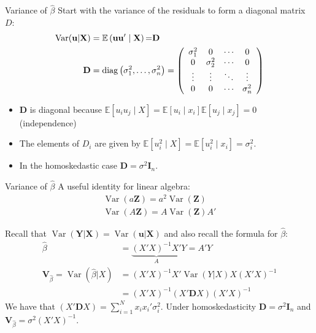 \documentclass[aspectratio=169,11pt]{beamer}
\begin{document}
\begin{frame}{Variance of $\widehat{\beta}$}
Start with the variance of the residuals to form a \alert{diagonal} matrix $D$:
\begin{align*}
\operatorname { Var } ( \mathbf{u} | \mathbf { X } ) &= \mathbb { E } \left( \mathbf{u u} ^ { \prime } \mid \mathbf { X } \right){ = } \mathbf { D }\\
\mathbf { D } &= \operatorname { diag } \left( \sigma _ { 1 } ^ { 2 } , \ldots , \sigma _ { n } ^ { 2 } \right) = \left( \begin{array} { c c c c } { \sigma _ { 1 } ^ { 2 } } & { 0 } & { \cdots } & { 0 } \\ { 0 } & { \sigma _ { 2 } ^ { 2 } } & { \cdots } & { 0 } \\ { \vdots } & { \vdots } & { \ddots } & { \vdots } \\ { 0 } & { 0 } & { \cdots } & { \sigma _ { n } ^ { 2 } } \end{array} \right)
\end{align*}
\begin{itemize}
\item $\mathbf{D}$ is diagonal because $\mathbb { E }[u_i u_j \mid  X] = \mathbb { E }[u_i  \mid x_i]  \mathbb { E }[u_j  \mid  x_j]=0$ (independence)
\item The elements of $D_i$ are given by $\mathbb { E }[u_i^2 \mid  X] = \mathbb { E }[u_i^2 \mid x_i] = \sigma_i^2$.
\item In the \alert{homoskedastic} case $\mathbf{D} = \sigma^2 \mathbf{I}_n$.
\end{itemize}
\end{frame}

\begin{frame}{Variance of $\widehat{\beta}$}
A useful identity for linear algebra:
\begin{align*}
\operatorname { Var } (a \mathbf{Z} ) = a^2 \operatorname { Var }(\mathbf{Z})\\
\operatorname { Var } (A \mathbf{Z} ) = A \operatorname { Var }(\mathbf{Z}) A'
\end{align*}

Recall that $\operatorname { Var } ( \mathbf{Y} |\mathbf{X} )  = \operatorname { Var } ( \mathbf{u} | \mathbf { X } ) $ and also
recall the formula for $\widehat{\beta}$:
\begin{align*}
\widehat{\beta} &= \underbrace{(X'X)^{-1} X' }_{A} Y= A' Y \\
\mathbf{V}_{\widehat{\beta}} = \operatorname { Var }(\widehat{\beta} | X)&= (X'X)^{-1} X'  \operatorname { Var }(Y| X) X (X'X)^{-1} \\
													     &= (X'X)^{-1} (X'  \mathbf{D} X) (X'X)^{-1} 
\end{align*}
We have that $ (X'  \mathbf{D} X)  = \sum_{i=1}^N x_i x_i'\sigma_i^2$. Under homoskedasticity $\mathbf{D} = \sigma^2 \mathbf{I}_n$ and $\mathbf{V}_{\widehat{\beta}} = \sigma^2 (X'X)^{-1}$.
\end{frame}
\end{document}
